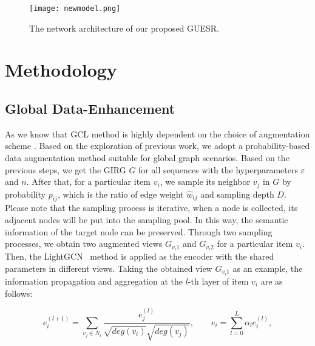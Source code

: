 \documentclass[runningheads]{llncs}
\begin{document}
\begin{figure}[t]
   \centering 
    	\texttt{[image: newmodel.png]}
  	\caption{The network architecture of our proposed GUESR.} \vspace{-12pt}
    \label{fig:framework}
\end{figure}

\vspace{-10pt}
\section{Methodology}
\vspace{-5pt}


\subsection{Global Data-Enhancement}
\vspace{-2pt}

As we know that GCL method is highly dependent on the choice of augmentation scheme \cite{Augmentation}. Based on the exploration of previous work, we adopt a probability-based data augmentation method suitable for global graph scenarios. 
Based on the previous steps, we get the GIRG $G$ for all sequences with the hyperparameters $\varepsilon$ and $n$. After that, for a particular item $v_i$, we sample its neighbor $v_j$ in $G$ by probability $p_{ij}$, which is the ratio of edge weight $\hat{w}_{ij}$ and sampling depth $D$. Please note that the sampling process is iterative, when a node is collected, its adjacent nodes will be put into the sampling pool. 
In this way, the semantic information of the target node can be preserved. 
Through two sampling processes, we obtain two augmented views $G_{v_i1}$ and $G_{v_i2}$ for a particular item $v_i$. Then, the LightGCN~\cite{lightgcn} method is applied as the encoder with the shared parameters in different views. Taking the obtained view $G_{{v_i}1}$ as an example, the information propagation and aggregation at the $l$-th layer of item $v_i$ are as follows:

\vspace{-10pt}
\begin{equation}
e_{i}^{(l+1)}=\sum_{v_j \in N_{i}} \frac{e_{j}^{(l)}}{\sqrt{deg(v_{i})} \sqrt{ deg(v_{j})}},  \qquad e_{i}=\sum_{l=0}^{L} \alpha_{l} e_{i}^{(l)},
\end{equation}
\vspace{-10pt}
\end{document}
